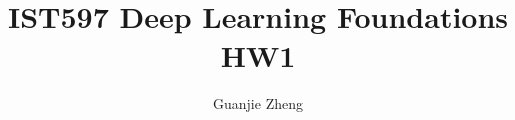 \documentclass{article}
\begin{document}
\title{IST597 Deep Learning Foundations HW1}
\author{Guanjie Zheng}
\maketitle




\end{document}
